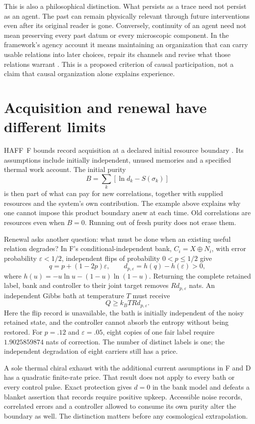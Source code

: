 \documentclass[12pt,a4paper]{article}
\begin{document}
This is also a philosophical distinction. What persists as a trace need not persist as an agent. The past can remain physically relevant through future interventions even after its original reader is gone. Conversely, continuity of an agent need not mean preserving every past datum or every microscopic component. In the framework's agency account it means maintaining an organization that can carry usable relations into later choices, repair its channels and revise what those relations warrant \cite{C,TD}. This is a proposed criterion of causal participation, not a claim that causal organization alone explains experience.

\section{Acquisition and renewal have different limits}

HAFF~F bounds record acquisition at a declared initial resource boundary \cite{F}. Its assumptions include initially independent, unused memories and a specified thermal work account. The initial purity
\[
 B=\sum_k[\ln d_k-S(\sigma_k)]
\]
is then part of what can pay for new correlations, together with supplied resources and the system's own contribution. The example above explains why one cannot impose this product boundary anew at each time. Old correlations are resources even when $B=0$. Running out of fresh purity does not erase them.

Renewal asks another question: what must be done when an existing useful relation degrades? In F's conditional-independent bank, $C_i=X\oplus N_i$, with error probability $\varepsilon<1/2$, independent flips of probability $0<p\le1/2$ give
\[
 q=p+(1-2p)\varepsilon,\qquad
 d_{p,\varepsilon}=h(q)-h(\varepsilon)>0,
\]
where $h(u)=-u\ln u-(1-u)\ln(1-u)$. Returning the complete retained label, bank and controller to their joint target removes $R d_{p,\varepsilon}$ nats. An independent Gibbs bath at temperature $T$ must receive
\[
 Q\ge k_BT R d_{p,\varepsilon}.
\]
Here the flip record is unavailable, the bath is initially independent of the noisy retained state, and the controller cannot absorb the entropy without being restored. For $p=.12$ and $\varepsilon=.05$, eight copies of one fair label require $1.9025859874$ nats of correction. The number of distinct labels is one; the independent degradation of eight carriers still has a price.

A sole thermal chiral exhaust with the additional current assumptions in F and D has a quadratic finite-rate price. That result does not apply to every bath or every control pulse. Exact protection gives $d=0$ in the bank model and defeats a blanket assertion that records require positive upkeep. Accessible noise records, correlated errors and a controller allowed to consume its own purity alter the boundary as well. The distinction matters before any cosmological extrapolation.
\end{document}
